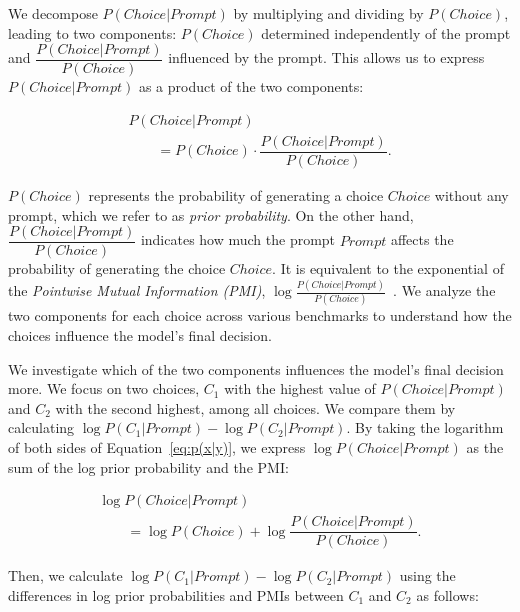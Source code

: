 We decompose {\small $P(Choice|Prompt)$} by multiplying and dividing by {\small $P(Choice)$}, leading to two components:
{\small $P(Choice)$} determined independently of the prompt and {\small $\dfrac{P(Choice|Prompt)}{P(Choice)}$} influenced by the prompt. This allows us to express {\small $P(Choice|Prompt)$} as a product of the two components: 

\begin{small}
\begin{equation}
\label{eq:p(x|y)}
\begin{array}{l}
P(Choice|Prompt) \\[5pt]
\quad \quad = P(Choice) \cdot \dfrac{P(Choice|Prompt)}{P(Choice)}.
\end{array}
\end{equation}
\end{small}
{\small $P(Choice)$} represents the probability of generating a choice $Choice$ without any prompt, which we refer to as \textit{prior probability}. On the other hand, {\small $\dfrac{P(Choice|Prompt)}{P(Choice)}$} indicates how much the prompt $Prompt$ affects the probability of generating the choice $Choice$. It is equivalent to the exponential of the \textit{Pointwise Mutual Information (PMI)}, $\log{\frac{P(Choice|Prompt)}{P(Choice)}}$~\cite{pmi}. We analyze the two components for each choice across various benchmarks to understand how the choices influence the model's final decision.



We investigate which of the two components influences the model's final decision more.  We focus on two choices,  $C_1$ with the highest value of {\small $P(Choice|Prompt)$}  and $C_2$ with the second highest, among all choices.  We compare them by calculating {\small $\log{P(C_1|Prompt)}-\log{P(C_2|Prompt)}$}. By taking the logarithm of both sides of Equation~\eqref{eq:p(x|y)}, we express {\small $\log{P(Choice|Prompt)}$} as the sum of the log prior probability and the PMI:
\begin{small}
\[
\begin{array}{l}
\log P(Choice|Prompt) \\
\quad \quad = \log P(Choice) + \log \dfrac{P(Choice|Prompt)}{P(Choice)}.
\end{array}
\]
\end{small}
Then, we calculate $\log{P(C_1|Prompt)} - \log{P(C_2|Prompt)}$ using the differences in log prior probabilities and PMIs between $C_1$ and $C_2$ as follows:


